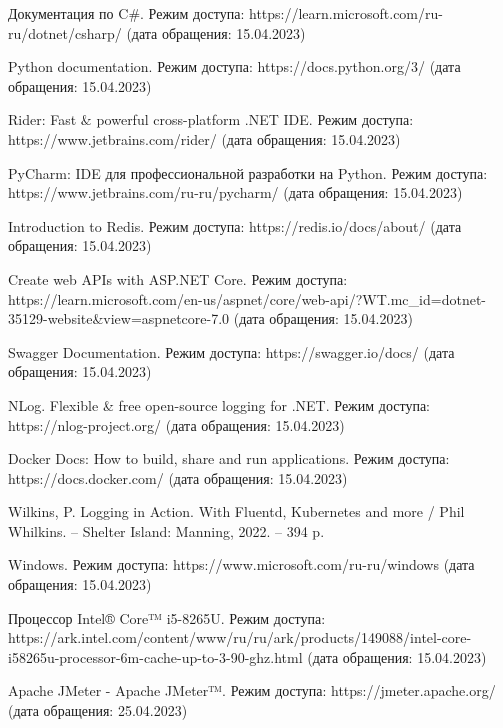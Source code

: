 \begin{thebibliography}{}
    Документация по C$\#$. Режим доступа: https://learn.microsoft.com/ru-ru/dotnet/csharp/ (дата обращения: 15.04.2023)
    
    Python documentation. Режим доступа: https://docs.python.org/3/ (дата обращения: 15.04.2023)
    
    Rider: Fast $\&$ powerful cross-platform .NET IDE. Режим доступа: https://www.jetbrains.com/rider/ (дата обращения: 15.04.2023)
    
    PyCharm: IDE для профессиональной разработки на Python. Режим доступа: https://www.jetbrains.com/ru-ru/pycharm/ (дата обращения: 15.04.2023)
    
    Introduction to Redis. Режим доступа: https://redis.io/docs/about/ (дата обращения: 15.04.2023)
    
    Create web APIs with ASP.NET Core. Режим доступа: https://learn.microsoft.com/en-us/aspnet/core/web-api/?WT.mc\_id=dotnet-35129-website\&view=aspnetcore-7.0 (дата обращения: 15.04.2023)
    
    Swagger Documentation. Режим доступа: https://swagger.io/docs/ (дата обращения: 15.04.2023)
    
    NLog. Flexible \& free open-source logging for .NET. Режим доступа: https://nlog-project.org/ (дата обращения: 15.04.2023)
    
    Docker Docs: How to build, share and run applications. Режим доступа: https://docs.docker.com/ (дата обращения: 15.04.2023)
    
    Wilkins, P. Logging in Action. With Fluentd, Kubernetes and more / Phil Whilkins. -- Shelter Island: Manning, 2022. -- 394 p.
    
    Windows. Режим доступа: https://www.microsoft.com/ru-ru/windows (дата обращения: 15.04.2023)
    
    Процессор Intel® Core™ i5-8265U. Режим доступа: https://ark.intel.com/content/www/ru/ru/ark/products/149088/intel-core-i58265u-processor-6m-cache-up-to-3-90-ghz.html (дата обращения: 15.04.2023)
    
    Apache JMeter - Apache JMeter™. Режим доступа: https://jmeter.apache.org/ (дата обращения: 25.04.2023)
    
\end{thebibliography}
\endgroup

\pagebreak